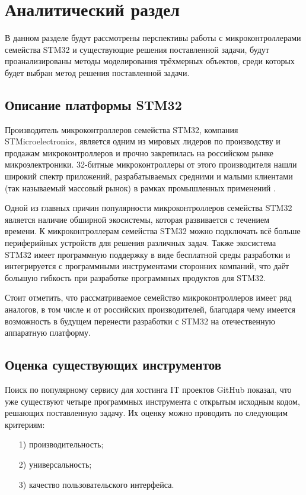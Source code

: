 \chapter{Аналитический раздел}
\label{cha:analysis}
%
%

В данном разделе будут рассмотрены перспективы работы с микроконтроллерами семейства STM32 и существующие решения поставленной задачи, 
будут проанализированы методы моделирования трёхмерных объектов, среди которых будет выбран метод решения поставленной задачи.

\section{Описание платформы STM32}

Производитель микроконтроллеров семейства STM32, компания STMicroelectronics, является одним из мировых лидеров по производству и продажам микроконтроллеров и прочно закрепилась на российском рынке микроэлектроники. 32-битные микроконтроллеры от этого производителя нашли широкий спектр приложений, разрабатываемых средними и малыми клиентами (так называемый массовый рынок) в рамках промышленных применений \cite{STMicroelectronics_description}.

Одной из главных причин популярности микроконтроллеров семейства STM32 является наличие обширной экосистемы, которая развивается с течением времени. К микроконтроллерам семейства STM32 можно подключать всё больше периферийных устройств для решения различных задач. Также экосистема STM32 имеет программную поддержку в виде бесплатной среды разработки и интегрируется с программными инструментами сторонних компаний, что даёт большую гибкость при разработке программных продуктов для STM32.

Стоит отметить, что рассматриваемое семейство микроконтроллеров имеет ряд аналогов, в том числе и от российских производителей, благодаря чему имеется возможность в будущем перенести разработки с STM32 на отечественную аппаратную платформу.

\section{Оценка существующих инструментов}

Поиск по популярному сервису для хостинга IT проектов GitHub \cite{git0} показал, что уже существуют четыре программных инструмента с открытым исходным кодом, решающих поставленную задачу. Их оценку можно проводить по следующим критериям:
\begin{enumerate}
	\item[1)] производительность;
	\item[2)] универсальность;
	\item[3)] качество пользовательского интерфейса.
\end{enumerate}

